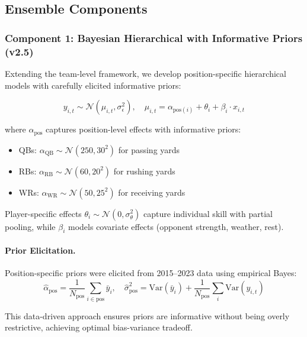 \subsection{Ensemble Components}

\subsubsection{Component 1: Bayesian Hierarchical with Informative Priors (v2.5)}

Extending the team-level framework, we develop position-specific hierarchical models with carefully elicited informative priors:

\begin{equation}\label{eq:player-hierarchical}
y_{i,t} \sim \mathcal{N}(\mu_{i,t}, \sigma_\epsilon^2), \quad
\mu_{i,t} = \alpha_{\text{pos}(i)} + \theta_i + \beta_i \cdot x_{i,t}
\end{equation}

where $\alpha_{\text{pos}}$ captures position-level effects with informative priors:
\begin{itemize}
  \item QBs: $\alpha_{\text{QB}} \sim \mathcal{N}(250, 30^2)$ for passing yards
  \item RBs: $\alpha_{\text{RB}} \sim \mathcal{N}(60, 20^2)$ for rushing yards
  \item WRs: $\alpha_{\text{WR}} \sim \mathcal{N}(50, 25^2)$ for receiving yards
\end{itemize}

Player-specific effects $\theta_i \sim \mathcal{N}(0, \sigma_\theta^2)$ capture individual skill with partial pooling, while $\beta_i$ models covariate effects (opponent strength, weather, rest).

\paragraph{Prior Elicitation.}
Position-specific priors were elicited from 2015--2023 data using empirical Bayes:
\begin{equation}
\hat{\alpha}_{\text{pos}} = \frac{1}{N_{\text{pos}}} \sum_{i \in \text{pos}} \bar{y}_i, \quad
\hat{\sigma}_{\text{pos}}^2 = \text{Var}(\bar{y}_i) + \frac{1}{N_{\text{pos}}} \sum_{i} \text{Var}(y_{i,t})
\end{equation}

This data-driven approach ensures priors are informative without being overly restrictive, achieving optimal bias-variance tradeoff.

